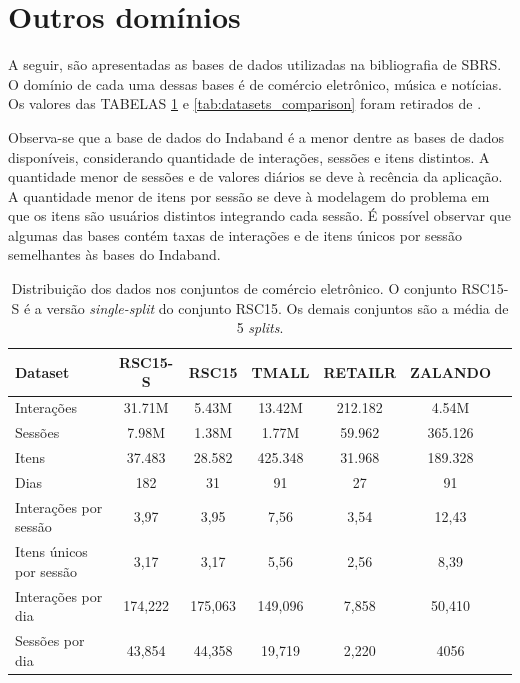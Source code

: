  \section{Outros domínios}
 A seguir, são apresentadas as bases de dados utilizadas na bibliografia de
  SBRS. O domínio de cada uma dessas bases é de comércio eletrônico, música e
  notícias. Os valores das TABELAS \ref{tab:datasets} e
  \ref{tab:datasets_comparison} foram retirados de \citet{ludewig_2018}.

  Observa-se que a base de dados do Indaband é a menor dentre as bases de dados
  disponíveis, considerando quantidade de interações, sessões e itens distintos.
  A quantidade menor de sessões e de valores diários se deve à recência da
  aplicação. A quantidade menor de itens por sessão se deve à modelagem do
  problema em que os itens são usuários distintos integrando cada sessão.
  É possível observar que algumas das bases contém taxas de interações e
  de itens únicos por sessão semelhantes às bases do Indaband.
  
  \begin{table}[htbp]
    \centering
    \begin{tabular}{lcccccc}
        \toprule
        \textbf{Dataset} & \textbf{RSC15-S} & \textbf{RSC15} & \textbf{TMALL} & \textbf{RETAILR} & \textbf{ZALANDO} \\
        \midrule
        Interações & 31.71M & 5.43M & 13.42M & 212.182 & 4.54M \\
        Sessões & 7.98M & 1.38M & 1.77M & 59.962 & 365.126 \\
        Itens & 37.483 & 28.582 & 425.348 & 31.968 & 189.328 \\
        Dias & 182 & 31 & 91 & 27 & 91 \\
        \hline
        Interações por sessão & 3,97 & 3,95 & 7,56 & 3,54 & 12,43 \\ 
        Itens únicos por sessão & 3,17 & 3,17 & 5,56 & 2,56 & 8,39 \\ 
        Interações por dia & 174,222 & 175,063 & 149,096 & 7,858 & 50,410 \\
        Sessões por dia & 43,854 & 44,358 & 19,719 & 2,220 & 4056 \\ 
        \bottomrule
    \end{tabular}
    \caption{Distribuição dos dados nos conjuntos de comércio eletrônico. O
    conjunto RSC15-S é a versão \textit{single-split} do conjunto RSC15. Os demais
    conjuntos são a média de 5 \textit{splits}. }
    \label{tab:datasets}
  \end{table}
  
